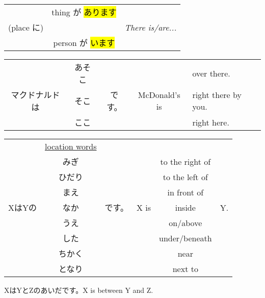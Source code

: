     {
    \begin{center}
        \begin{tabular}{|rc|l|}
        \hline
                   &  thing が \hl{あります} & \hspace{0mm} \\
        (place に) &                         & \textit{There is/are...} \\
                   &  person が \hl{います}  & \hspace{0mm} \\
        \hline
        \end{tabular}
    \end{center}
    }

    {
    \begin{center}
        \begin{tabular}{|ccc|cl|}
            \hline
                           & あそこ &       &               & over there. \\
            マクドナルドは & そこ   & です。& McDonald's is & right there by you. \\
                           & ここ   &       &               & right here. \\
            \hline
        \end{tabular} 
    \end{center}
    
    \begin{center}
        \begin{tabular}{|ccc|ccc|}
            \hline
                   & \underline{location words} &&&& \hspace{0mm} \\
                   & みぎ          &&      & to the right of     & \hspace{0mm} \\
                   & ひだり        &&      & to the left of      & \hspace{0mm} \\
                   & まえ          &&      & in front of         & \hspace{0mm} \\
            XはYの & なか & です。  & X is & inside              & Y. \\
                   & うえ          &&      & on/above            & \hspace{0mm} \\
                   & した          &&      & under/beneath       & \hspace{0mm} \\
                   & ちかく        &&      & near                & \hspace{0mm} \\
                   & となり        &&      & next to             & \hspace{0mm} \\
            \hline
        \end{tabular}
    \end{center}
    
    XはYとZのあいだです。X is between Y and Z.
    }

